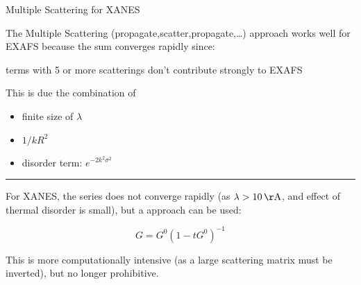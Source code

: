
\begin{slide}{Multiple Scattering for XANES}

    \vmm

    
    The Multiple Scattering (propagate,scatter,propagate,\ldots) approach 
    works well for EXAFS because the sum converges rapidly since:

    \begin{center} terms with 5 or more scatterings don't contribute
      strongly to EXAFS \end{center}


    This is due the combination of 
    \begin{itemize}
      \item finite size of $\lambda$
      \item $1/kR^2$
      \item disorder term:  $e^{-2k^2\sigma^2}$
    \end{itemize}
      
    \vmm   
    \hrule
    \vmm
    
    For XANES, the series does not converge rapidly (as $\lambda >
    10\rm\,\AA$, and effect of thermal disorder is small), but a
    {} approach can be used:
   
    \[ G = G^0 ( 1 - t G^0)^{-1} \]
    
    This is more computationally intensive (as a large scattering matrix
    must be inverted), but no longer prohibitive.

  \vfill
\end{slide} 
